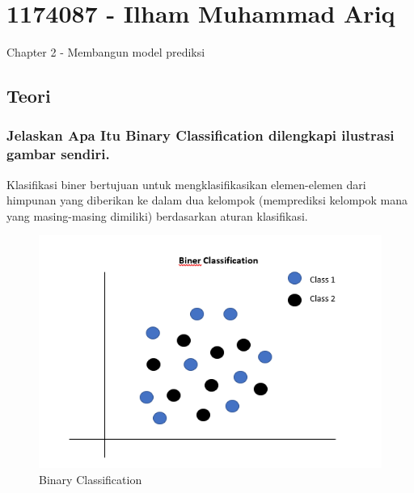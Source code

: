 \section{1174087 - Ilham Muhammad Ariq}
Chapter 2 - Membangun model prediksi
\subsection{Teori}
\subsubsection{Jelaskan Apa Itu Binary Classification dilengkapi ilustrasi gambar sendiri.}

Klasifikasi biner bertujuan untuk mengklasifikasikan elemen-elemen dari himpunan yang diberikan ke dalam dua kelompok (memprediksi kelompok mana yang masing-masing dimiliki) berdasarkan aturan klasifikasi. 
\hfill\\
\begin{figure}[H]
    \includegraphics[width=12cm]{figures/1174087/2/kb.png}
    \centering
    \caption{Binary Classification}
\end{figure}

